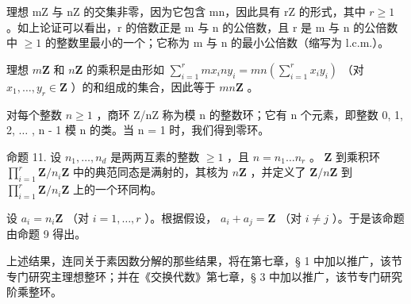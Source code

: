 理想 mZ 与 nZ 的交集非零，因为它包含 mn，因此具有 rZ 的形式，其中 \(r \geqslant 1\) 。如上论证可以看出，r 的倍数正是 m 与 n 的公倍数，且 r 是 m 与 n 的公倍数中 \(\geqslant 1\) 的整数里最小的一个；它称为 m 与 n 的最小公倍数（缩写为 l.c.m.）。

理想 \(m\mathbf{Z}\) 和 \(n\mathbf{Z}\) 的乘积是由形如 \(\sum_{i=1}^{r} mx_i ny_i = mn\left(\sum_{i=1}^{r} x_i y_i\right)\) （对 \(x_1, \ldots, y_r \in \mathbf{Z}\) ）的和组成的集合，因此等于 \(mn\mathbf{Z}\) 。

对每个整数 \(n \geqslant 1\) ，商环 Z/nZ 称为模 n 的整数环；它有 n 个元素，即整数 0, 1, 2, \(\ldots\) , n - 1 模 n 的类。当 n = 1 时，我们得到零环。

命题 11. 设 \(n_1, \ldots, n_d\) 是两两互素的整数 \(\geqslant 1\) ，且 \(n = n_1 \ldots n_r\) 。 \(\mathbf{Z}\) 到乘积环 \(\prod_{i=1}^{r} \mathbf{Z} / n_i \mathbf{Z}\) 中的典范同态是满射的，其核为 \(n\mathbf{Z}\) ，并定义了 \(\mathbf{Z} / n\mathbf{Z}\) 到 \(\prod_{i=1}^{r} \mathbf{Z} / n_i \mathbf{Z}\) 上的一个环同构。

设 \(a_{i} = n_{i}\mathbf{Z}\) （对 \(i = 1, \ldots, r\) ）。根据假设， \(a_{i} + a_{j} = \mathbf{Z}\) （对 \(i \neq j\) ）。于是该命题由命题 9 得出。

上述结果，连同关于素因数分解的那些结果，将在第七章，§ 1 中加以推广，该节专门研究主理想整环；并在《交换代数》第七章，§ 3 中加以推广，该节专门研究阶乘整环。
\relax{}
